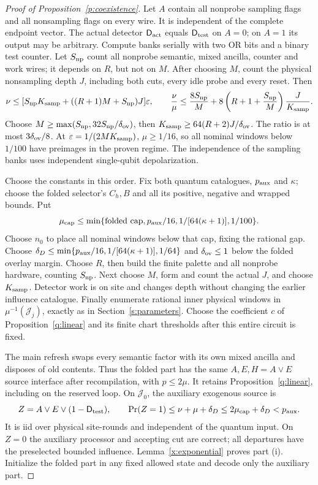 \begin{proof}[Proof of Proposition~\ref{p:coexistence}]
Let \(A\) contain all nonprobe sampling flags and all nonsampling
flags on every wire. It is independent of the complete endpoint
vector. The actual detector \(\mathsf D_{\rm act}\) equals \(\mathsf D_{\rm test}\) on
\(A=0\); on \(A=1\) its output may be arbitrary. Compute banks
serially with two OR bits and a binary test counter. Let \(S_{\rm np}\)
count all nonprobe semantic, mixed ancilla, counter and work wires;
it depends on \(R\), but not on \(M\). After choosing \(M\),
count the physical nonsampling depth \(J\), including both cuts, every
idle probe and every reset. Then
\[
 \nu\le[S_{\rm np}K_{\rm samp}+((R+1)M+S_{\rm np})J]\varepsilon,
 \qquad
 \frac\nu\mu\le\frac{8S_{\rm np}}M+
       8\left(R+1+\frac{S_{\rm np}}M\right)\frac J{K_{\rm samp}}.
\]
Choose \(M\ge\max(S_{\rm np},32S_{\rm np}/\delta_{\rm ov})\), then
\(K_{\rm samp}\ge64(R+2)J/\delta_{\rm ov}\). The ratio is at most
\(3\delta_{\rm ov}/8\). At \(\varepsilon=1/(2MK_{\rm samp})\),
\(\mu\ge1/16\), so all nominal windows below \(1/100\) have
preimages in the proven regime. The independence of the sampling banks uses independent single-qubit depolarization.

Choose the constants in this order. Fix both quantum catalogues,
\(p_{\rm aux}\) and \(\kappa\); choose the folded selector's
\(C_h,B\) and all its positive, negative and wrapped bounds. Put
\[
 \mu_{\rm cap}\le\min\{\text{folded cap},p_{\rm aux}/16,
                  1/[64(\kappa+1)],1/100\}.
\]
Choose \(n_0\) to place all nominal windows below that cap, fixing
the rational gap. Choose
\(\delta_D\le\min\{p_{\rm aux}/16,1/[64(\kappa+1)],1/64\}\)
and \(\delta_{\rm ov}\le1\) below the folded overlay margin. Choose \(R\),
then build the finite palette and all nonprobe hardware, counting
\(S_{\rm np}\). Next choose \(M\), form and count the actual
\(J\), and choose \(K_{\rm samp}\). Detector work is on site and changes depth without changing
the earlier influence catalogue. Finally enumerate rational inner
physical windows in \(\mu^{-1}(\mathcal J_j)\), exactly as in
Section~\ref{s:parameters}. Choose the coefficient \(c\) of
Proposition~\ref{q:linear} and its finite
chart thresholds after this entire circuit is fixed.

The main refresh swaps every semantic factor with its own mixed ancilla and disposes of old contents. Thus the folded part has the
same \(A,E,H=A\lor E\) source interface after recompilation, with
\(p\le2\mu\). It retains Proposition~\ref{q:linear}, including on
the reserved loop. On \(\mathcal J_0\), the auxiliary exogenous source is
\[
 Z=A\lor E\lor(1-\mathsf D_{\rm test}),\qquad
 \Pr(Z=1)\le\nu+\mu+\delta_D
                  \le2\mu_{\rm cap}+\delta_D< p_{\rm aux}.
\]
It is iid over physical site-rounds and independent of the quantum
input. On \(Z=0\) the auxiliary processor and accepting cut are
correct; all departures have the preselected bounded influence.
Lemma~\ref{x:exponential} proves part (i). Initialize the folded
part in any fixed allowed state and decode only the auxiliary part.


\end{proof}
